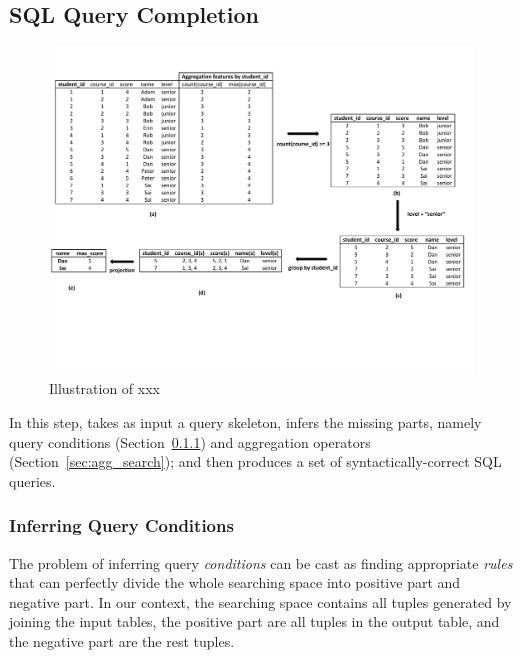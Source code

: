 \subsection{SQL Query Completion}
\label{sec:completion}


\begin{figure}[t]
  \centering
  \includegraphics[scale=0.65]{fullexample}
  \vspace*{-1.0ex}\caption {{\label{fig:fullexample}
  Illustration of xxx 
}}

\end{figure}

In this step, \ourtool takes as input a query skeleton, infers
the missing parts, namely
query conditions (Section~\ref{sec:condition}) and
aggregation operators (Section~\ref{sec:agg_search}); and then produces a
set of syntactically-correct SQL queries.


\subsubsection{Inferring Query Conditions}
\label{sec:condition}

The problem of inferring query \textit{conditions} can be cast as finding
appropriate \textit{rules} that can perfectly divide the whole searching space
into positive part and negative part. In our context, the searching space
contains all tuples generated by joining the input tables, the positive part
are all tuples in the output table, and the negative part are the rest
tuples.

